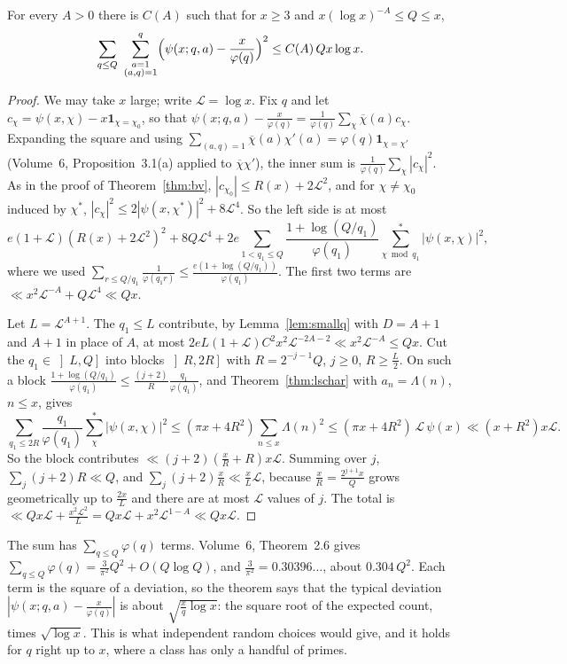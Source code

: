 \begin{theorem}\label{thm:bdh}
For every $A>0$ there is $C(A)$ such that for $x\ge3$ and $x(\log x)^{-A}\le Q\le x$,
\[
\sum_{q\le Q}\ \sum_{\substack{a=1\\(a,q)=1}}^q\Bigl(\psi(x;q,a)-\frac x{\varphi(q)}\Bigr)^2\le C(A)\,Qx\log x.
\]
\end{theorem}
\begin{proof}
We may take $x$ large; write $\mathcal L=\log x$. Fix $q$ and let $c_\chi=\psi(x,\chi)-x\mathbf 1_{\chi=\chi_0}$, so that $\psi(x;q,a)-\frac x{\varphi(q)}=\frac1{\varphi(q)}\sum_\chi\overline\chi(a)c_\chi$. Expanding the square and using $\sum_{(a,q)=1}\overline\chi(a)\chi'(a)=\varphi(q)\mathbf 1_{\chi=\chi'}$ (Volume~6, Proposition~3.1(a) applied to $\overline\chi\chi'$), the inner sum is $\frac1{\varphi(q)}\sum_\chi|c_\chi|^2$. As in the proof of Theorem~\ref{thm:bv}, $|c_{\chi_0}|\le R(x)+2\mathcal L^2$, and for $\chi\ne\chi_0$ induced by $\chi^*$, $|c_\chi|^2\le2|\psi(x,\chi^*)|^2+8\mathcal L^4$. So the left side is at most
\[
e(1+\mathcal L)(R(x)+2\mathcal L^2)^2+8Q\mathcal L^4+2e\sum_{1<q_1\le Q}\frac{1+\log(Q/q_1)}{\varphi(q_1)}\sum^*_{\chi\bmod q_1}|\psi(x,\chi)|^2,
\]
where we used $\sum_{r\le Q/q_1}\frac1{\varphi(q_1r)}\le\frac{e(1+\log(Q/q_1))}{\varphi(q_1)}$. The first two terms are $\ll x^2\mathcal L^{-A}+Q\mathcal L^4\ll Qx$.

Let $L=\mathcal L^{A+1}$. The $q_1\le L$ contribute, by Lemma~\ref{lem:smallq} with $D=A+1$ and $A+1$ in place of $A$, at most $2eL(1+\mathcal L)C^2x^2\mathcal L^{-2A-2}\ll x^2\mathcal L^{-A}\le Qx$.
Cut the $q_1\in\left]L,Q\right]$ into blocks $\left]R,2R\right]$ with $R=2^{-j-1}Q$, $j\ge0$, $R\ge\frac L2$. On such a block $\frac{1+\log(Q/q_1)}{\varphi(q_1)}\le\frac{(j+2)}R\frac{q_1}{\varphi(q_1)}$, and Theorem~\ref{thm:lschar} with $a_n=\Lambda(n)$, $n\le x$, gives
\[
\sum_{q_1\le2R}\frac{q_1}{\varphi(q_1)}\sum^*_{\chi}|\psi(x,\chi)|^2\le(\pi x+4R^2)\sum_{n\le x}\Lambda(n)^2\le(\pi x+4R^2)\,\mathcal L\,\psi(x)\ll(x+R^2)x\mathcal L.
\]
So the block contributes $\ll(j+2)(\frac xR+R)x\mathcal L$. Summing over $j$, $\sum_j(j+2)R\ll Q$, and $\sum_j(j+2)\frac xR\ll\frac xL\mathcal L$, because $\frac xR=\frac{2^{j+1}x}Q$ grows geometrically up to $\frac{2x}L$ and there are at most $\mathcal L$ values of $j$. The total is $\ll Qx\mathcal L+\frac{x^2\mathcal L^2}L=Qx\mathcal L+x^2\mathcal L^{1-A}\ll Qx\mathcal L$.
\end{proof}

The sum has $\sum_{q\le Q}\varphi(q)$ terms. Volume~6, Theorem~2.6 gives $\sum_{q\le Q}\varphi(q)=\frac3{\pi^2}Q^2+O(Q\log Q)$, and $\frac3{\pi^2}=0.30396\ldots$, about $0.304\,Q^2$. Each term is the square of a deviation, so the theorem says that the typical deviation $|\psi(x;q,a)-\frac x{\varphi(q)}|$ is about $\sqrt{\frac xq\log x}$: the square root of the expected count, times $\sqrt{\log x}$. This is what independent random choices would give, and it holds for $q$ right up to $x$, where a class has only a handful of primes.

